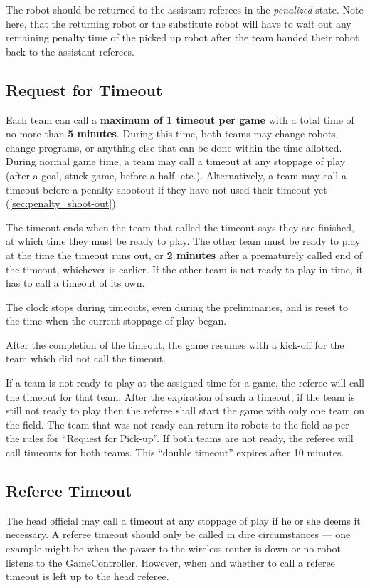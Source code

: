 The robot should be returned to the assistant referees in the \emph{penalized} state.
Note here, that the returning robot or the substitute robot will have to wait out any remaining penalty time of the picked up robot after the team handed their robot back to the assistant referees.

\subsection{Request for Timeout}
\label{sec:request_for_timeout}

Each team can call a \textbf{maximum of 1 timeout per game} with a total time of no more than \textbf{5 minutes}. During this time, both teams may change robots, change programs, or anything else that can be done within the time allotted.  During normal game time, a team may call a timeout at any stoppage of play (after a goal, stuck game, before a half, etc.). Alternatively, a team may call a timeout before a penalty shootout if they have not used their timeout yet (\cf \cref{sec:penalty_shoot-out}).

The timeout ends when the team that called the timeout says they are finished, at which time they must be ready to play. The other team must be ready to play at the time the timeout runs out, or \textbf{2 minutes} after a prematurely called end of the timeout, whichever is earlier. If the other team is not ready to play in time, it has to call a timeout of its own.

The clock stops during timeouts, even during the preliminaries, and is reset to the time when the current stoppage of play began.

After the completion of the timeout, the game resumes with a kick-off for the team which did not call the timeout.

If a team is not ready to play at the assigned time for a game, the referee will call the timeout for that team. After the expiration of such a timeout, if the team is still not ready to play then the referee shall start the game with only one team on the field.  The team that was not ready can return its robots to the field as per the rules for ``Request for Pick-up''. If both teams are not ready, the referee will call timeouts for both teams. This ``double timeout'' expires after 10 minutes.

\subsection{Referee Timeout}
\label{sec:referee_timeout}
The head official may call a timeout at any stoppage of play if he or she deems it necessary.  A referee timeout should only be called in dire circumstances --- one example might be when the power to the wireless router is down or no robot listens to the GameController.  However, when and whether to call a referee timeout is left up to the head referee.

